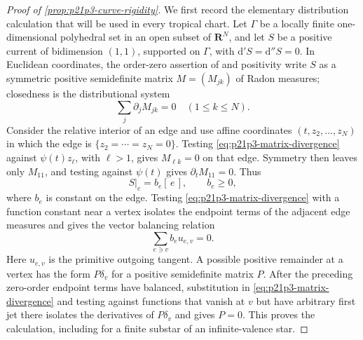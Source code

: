 \begin{proof}[Proof of \cref{prop:p21p3-curve-rigidity}]
We first record the elementary distribution calculation that will be
used in every tropical chart.  Let \(\Gamma\) be a locally finite
one-dimensional polyhedral set in an open subset of \(\mathbf R^N\), and
let \(S\) be a positive current of bidimension \((1,1)\), supported on
\(\Gamma\), with \(\mathrm d' S=\mathrm d''S=0\).  In Euclidean
coordinates, the order-zero assertion of
\cite[Proposition~7.2.9]{CLD25} and positivity write \(S\) as a
symmetric positive
semidefinite matrix \(M=(M_{jk})\) of Radon measures; closedness is the
distributional system
\begin{equation}
\label{eq:p21p3-matrix-divergence}
                   \sum_j\partial_jM_{jk}=0
                   \quad (1\leq k\leq N).
\end{equation}
Consider the relative interior of an edge and use affine coordinates
\((t,z_2,\ldots,z_N)\) in which the edge is
\(\{z_2=\cdots=z_N=0\}\).  Testing
\eqref{eq:p21p3-matrix-divergence} against
\(\psi(t)z_\ell\), with \(\ell>1\), gives \(M_{\ell k}=0\) on that
edge.  Symmetry then leaves only \(M_{11}\), and testing against
\(\psi(t)\) gives \(\partial_tM_{11}=0\).  Thus
\begin{equation}
\label{eq:p21p3-edge-density}
                     S|_e=b_e[\,e\,],
                     \qquad b_e\geq0,
\end{equation}
where \(b_e\) is constant on the edge.  Testing
\eqref{eq:p21p3-matrix-divergence} with a function constant near a vertex
isolates the endpoint terms of the adjacent edge measures and gives the
vector balancing relation
\begin{equation}
\label{eq:p21p3-current-balancing}
                       \sum_{e\ni v}b_eu_{e,v}=0.
\end{equation}
Here \(u_{e,v}\) is the primitive outgoing tangent.  A possible positive
remainder at a vertex has the form \(P\delta_v\) for a positive
semidefinite matrix \(P\).
After the preceding zero-order endpoint terms have balanced, substitution
in \eqref{eq:p21p3-matrix-divergence} and testing against functions that
vanish at \(v\) but have arbitrary first jet there isolates the
derivatives of \(P\delta_v\) and gives \(P=0\).
This proves the calculation,
including for a finite substar of an infinite-valence star.


\end{proof}
